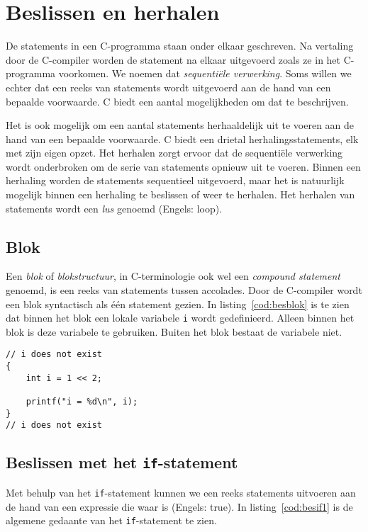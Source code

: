 \chapter{Beslissen en herhalen}
\label{cha:programmabesturing}
\thispagestyle{empty}

De statements in een C-programma staan onder elkaar geschreven. Na vertaling door de C-compiler worden de statement na elkaar uitgevoerd zoals ze in het C-programma voorkomen. We noemen dat \textsl{sequentiële verwerking}. Soms willen we echter dat een reeks van statements wordt uitgevoerd aan de hand van een bepaalde voorwaarde. C biedt een aantal mogelijkheden om dat te beschrijven.

Het is ook mogelijk om een aantal statements herhaaldelijk uit te voeren aan de hand van een bepaalde voorwaarde. C biedt een drietal herhalingsstatements, elk met zijn eigen opzet. Het herhalen zorgt ervoor dat de sequentiële verwerking wordt onderbroken om de serie van statements opnieuw uit te voeren. Binnen een herhaling worden de statements sequentieel uitgevoerd, maar het is natuurlijk mogelijk binnen een herhaling te beslissen of weer te herhalen. Het herhalen van statements wordt een \textsl{lus} genoemd (Engels: loop).


\section{Blok}
Een \textsl{blok} of \textsl{blokstructuur}, in C-terminologie ook wel een \textsl{compound statement} genoemd, is een reeks van statements tussen accolades. Door de C-compiler wordt een blok syntactisch als één statement gezien. In listing~\ref{cod:besblok} is te zien dat binnen het blok een lokale variabele \texttt{i} wordt gedefinieerd. Alleen binnen het blok is deze variabele te gebruiken. Buiten het blok bestaat de variabele niet.


\begin{lstlisting}[caption=Een blok met een lokale variabele.,label=cod:besblok]
// i does not exist
{
    int i = 1 << 2;
    
    printf("i = %d\n", i);
}
// i does not exist
\end{lstlisting}


\section{Beslissen met het \texttt{if}-statement}
Met behulp van het \texttt{if}-statement kunnen we een reeks statements uitvoeren aan de hand van een expressie die waar is (Engels: true). In listing~\ref{cod:besif1} is de algemene gedaante van het \texttt{if}-statement te zien.


